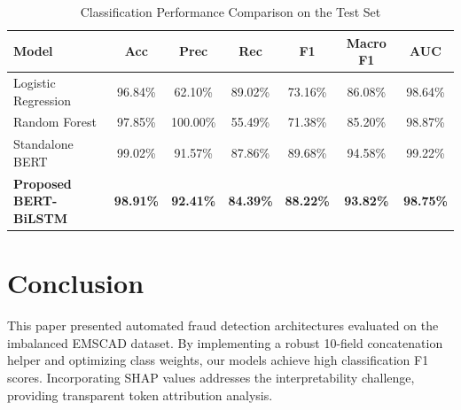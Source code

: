 \documentclass[conference]{IEEEtran}
\begin{document}
\begin{table}[htbp]
\caption{Classification Performance Comparison on the Test Set}
\label{tab:results}
\begin{center}
\begin{tabular}{lcccccc}
\toprule
\textbf{Model} & \textbf{Acc} & \textbf{Prec} & \textbf{Rec} & \textbf{F1} & \textbf{Macro F1} & \textbf{AUC} \\
\midrule
Logistic Regression & 96.84\% & 62.10\% & 89.02\% & 73.16\% & 86.08\% & 98.64\% \\
Random Forest & 97.85\% & 100.00\% & 55.49\% & 71.38\% & 85.20\% & 98.87\% \\
Standalone BERT & 99.02\% & 91.57\% & 87.86\% & 89.68\% & 94.58\% & 99.22\% \\
\textbf{Proposed BERT-BiLSTM} & \textbf{98.91\%} & \textbf{92.41\%} & \textbf{84.39\%} & \textbf{88.22\%} & \textbf{93.82\%} & \textbf{98.75\%} \\
\bottomrule
\end{tabular}
\end{center}
\end{table}

\section{Conclusion}
This paper presented automated fraud detection architectures evaluated on the imbalanced EMSCAD dataset. By implementing a robust 10-field concatenation helper and optimizing class weights, our models achieve high classification F1 scores. Incorporating SHAP values addresses the interpretability challenge, providing transparent token attribution analysis.



\end{document}
